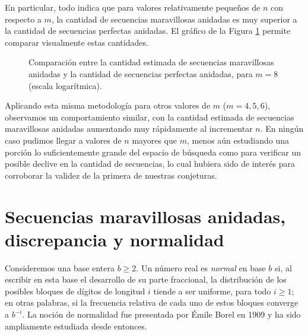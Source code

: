 En particular, todo indica que para valores relativamente pequeños de
$n$ con respecto a $m$, la cantidad de secuencias maravillosas anidadas es
muy superior a la cantidad de secuencias perfectas anidadas. El gráfico
de la Figura \ref{figure:compare-marvellous-perfect} permite comparar
visualmente estas cantidades.

\begin{figure}[H]
	\centering
	\caption{Comparación entre la cantidad estimada de secuencias maravillosas
	anidadas y la cantidad de secuencias perfectas anidadas, para $m = 8$
	(escala logarítmica).}
	\label{figure:compare-marvellous-perfect}
\end{figure}

Aplicando esta misma metodología para otros valores de $m$ ($m = 4, 5, 6$),
observamos un comportamiento similar, con la cantidad estimada de secuencias
maravillosas anidadas aumentando muy rápidamente al incrementar $n$. En ningún
caso pudimos llegar a valores de $n$ mayores que $m$, menos aún estudiando
una porción lo suficientemente grande del espacio de búsqueda como para
verificar un posible declive en la cantidad de secuencias,
lo cual hubiera sido de interés para corroborar la validez de la primera de
nuestras conjeturas.

\chapter{Secuencias maravillosas anidadas, discrepancia y normalidad}

Consideremos una base entera $b \geq 2$. Un número real es \emph{normal} en base
$b$ si, al escribir en esta base el desarrollo de su parte fraccional,
la distribución de los posibles bloques de dígitos de longitud $i$ tiende
a ser uniforme, para todo $i \geq 1$; en otras palabras, si la frecuencia
relativa de cada uno de estos bloques converge a $b^{-i}$. La noción de
normalidad fue presentada por Émile Borel \cite{borel-normality} en 1909 y ha
sido ampliamente estudiada desde entonces.

